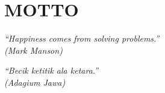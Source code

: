 %
%
%
\chapter*{MOTTO}

\vspace{2cm}
\begin{center}
\textit{
``Happiness comes from solving problems.''\\
(Mark Manson)
}

\vspace{2cm}
\textit{
``Becik ketitik ala ketara.''\\
(Adagium Jawa)
}
\end{center}

\newpage

